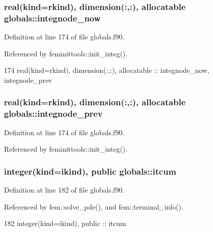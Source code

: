\subsubsection[{integnode\+\_\+now}]{\setlength{\rightskip}{0pt plus 5cm}real(kind=rkind), dimension(\+:,\+:), allocatable globals\+::integnode\+\_\+now}\label{namespaceglobals_a831c887b696920b02f532c5bf249c891}


Definition at line 174 of file globals.\+f90.



Referenced by feminittools\+::init\+\_\+integ().


\begin{DoxyCode}
174   \textcolor{keywordtype}{real(kind=rkind)}, \textcolor{keywordtype}{dimension(:,:)}, \textcolor{keywordtype}{allocatable} :: integnode_now, integnode_prev
\end{DoxyCode}
\subsubsection[{integnode\+\_\+prev}]{\setlength{\rightskip}{0pt plus 5cm}real(kind=rkind), dimension(\+:,\+:), allocatable globals\+::integnode\+\_\+prev}\label{namespaceglobals_a38ae115fe3f788f393d55fcca4c2a5f8}


Definition at line 174 of file globals.\+f90.



Referenced by feminittools\+::init\+\_\+integ().

\subsubsection[{itcum}]{\setlength{\rightskip}{0pt plus 5cm}integer(kind=ikind), public globals\+::itcum}\label{namespaceglobals_aa6a4a5d76861365119310181f470d399}


Definition at line 182 of file globals.\+f90.



Referenced by fem\+::solve\+\_\+pde(), and fem\+::terminal\+\_\+info().


\begin{DoxyCode}
182   \textcolor{keywordtype}{integer(kind=ikind)}, \textcolor{keywordtype}{public} :: itcum
\end{DoxyCode}

